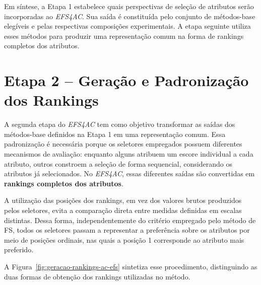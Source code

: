 Em síntese, a Etapa 1 estabelece quais perspectivas de seleção de atributos
serão incorporadas ao \textit{EFS4AC}. Sua saída é constituída pelo conjunto
de métodos-base elegíveis e pelas respectivas composições experimentais. A
etapa seguinte utiliza esses métodos para produzir uma representação comum na
forma de rankings completos dos atributos.
\section{Etapa 2 -- Geração e Padronização dos Rankings}
\label{sec:ac-efs-etapa2}

A segunda etapa do \textit{EFS4AC} tem como objetivo transformar as saídas dos
métodos-base definidos na Etapa 1 em uma representação comum. Essa padronização
é necessária porque os seletores empregados possuem diferentes mecanismos de
avaliação: enquanto alguns atribuem um escore individual a cada atributo,
outros constroem a seleção de forma sequencial, considerando os atributos já
selecionados. No \textit{EFS4AC}, essas diferentes saídas são convertidas em
\textbf{rankings completos dos atributos}.

A utilização das posições dos rankings, em vez dos valores brutos produzidos
pelos seletores, evita a comparação direta entre medidas definidas em escalas
distintas. Dessa forma, independentemente do critério empregado pelo método de
FS, todos os seletores passam a representar a preferência sobre os atributos
por meio de posições ordinais, nas quais a posição 1 corresponde ao atributo
mais preferido.

A Figura~\ref{fig:geracao-rankings-ac-efs} sintetiza esse procedimento,
distinguindo as duas formas de obtenção dos rankings utilizadas no método.

